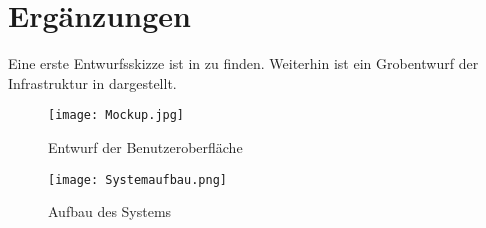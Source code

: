 \section{Ergänzungen}
\label{sec:Ergaenzungen}

Eine erste Entwurfsskizze ist in  zu finden.
Weiterhin ist ein Grobentwurf der Infrastruktur in  dargestellt.

\begin{figure}[htb]
\centering
\texttt{[image: Mockup.jpg]}
\caption[Mockup Benutzeransicht]{Entwurf der Benutzeroberfläche}
\label{fig:Mockup}
\end{figure}


\begin{figure}[htb]
\centering
\texttt{[image: Systemaufbau.png]}
\caption[Aufbau des Systems]{Aufbau des Systems}
\label{fig:Systemaufbau}
\end{figure}